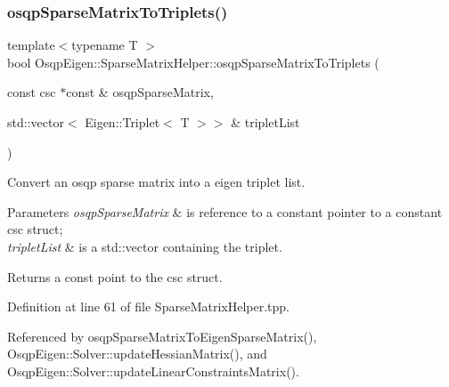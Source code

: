 \subsubsection{\texorpdfstring{osqp\+Sparse\+Matrix\+To\+Triplets()}{osqpSparseMatrixToTriplets()}}
{\footnotesize\ttfamily template$<$typename T $>$ \\
bool Osqp\+Eigen\+::\+Sparse\+Matrix\+Helper\+::osqp\+Sparse\+Matrix\+To\+Triplets (\begin{DoxyParamCaption}\item[{const csc $\ast$const \&}]{osqp\+Sparse\+Matrix,  }\item[{std\+::vector$<$ Eigen\+::\+Triplet$<$ T $>$$>$ \&}]{triplet\+List }\end{DoxyParamCaption})}



Convert an osqp sparse matrix into a eigen triplet list. 


\begin{DoxyParams}{Parameters}
{\em osqp\+Sparse\+Matrix} & is reference to a constant pointer to a constant csc struct; \\
\hline
{\em triplet\+List} & is a std\+::vector containing the triplet. \\
\hline
\end{DoxyParams}
\begin{DoxyReturn}{Returns}
a const point to the csc struct. 
\end{DoxyReturn}


Definition at line 61 of file Sparse\+Matrix\+Helper.\+tpp.



Referenced by osqp\+Sparse\+Matrix\+To\+Eigen\+Sparse\+Matrix(), Osqp\+Eigen\+::\+Solver\+::update\+Hessian\+Matrix(), and Osqp\+Eigen\+::\+Solver\+::update\+Linear\+Constraints\+Matrix().

